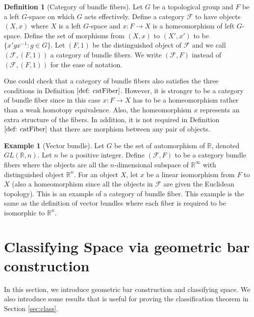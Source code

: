 \documentclass[psamsfonts]{amsart}
\theoremstyle{definition}
\newtheorem{defn}[thm]{Definition}
\newtheorem{exmp}[thm]{Example}
\theoremstyle{remark}
\numberwithin{equation}{section}
\begin{document}
\begin{defn}[Category of bundle fibers]
Let $G$ be a topological group and $F$ be a left $G$-space on which $G$ acts effectively. Define a category $\mathcal{F}$ to have objects $(X, x)$ where $X$ is a left $G$-space and $x: F \to X$ is a homeomorphism of left $G$-space. Define the set of morphisms from $(X, x)$ to $(X', x')$ to be $\{x'gx^{-1}: g \in G\}$. Let $(F, 1)$ be the distinguished object of $\mathcal{F}$ and we call $(\mathcal{F}, (F, 1))$ a category of bundle fibers. We write $(\mathcal{F}, F)$ instead of $(\mathcal{F}, (F, 1))$ for the ease of notation.
\end{defn}

One could check that a category of bundle fibers also satisfies the three conditions in Definition $\ref{def: catFiber}$. However, it is stronger to be a category of bundle fiber since in this case $x: F \to X$ has to be a homeomorphism rather than a weak homotopy equivalence. Also, the homeomorphism $x$ represents an extra structure of the fibers. In addition, it is not required in Definition $\ref{def: catFiber}$ that there are morphism between any pair of objects.

\begin{exmp}[Vector bundle]
Let $G$ be the set of automorphism of $\mathbb{R}$, denoted $GL(\mathbb{R}, n)$. Let $n$ be a positive integer. Define $(\mathcal{F}, F)$ to be a category bundle fibers where the objects are all the $n$-dimensional subspace of $\mathbb{R}^{\infty}$ with distinguished object $\mathbb{R}^{n}$. For an object $X$, let $x$ be a linear isomorphism from $F$ to $X$ (also a homeomorphism since all the objects in $\mathcal{F}$ are given the Euclidean topology). This is an example of a category of bundle fiber. This example is the same as the definition of vector bundles where each fiber is required to be isomorphic to $\mathbb{R}^{n}$.
\end{exmp}






\section{Classifying Space via geometric bar construction}
In this section, we introduce geometric bar construction and classifying space. We also introduce some results that is useful for proving the classification theorem in Section \ref{sec:class}.
\end{document}
